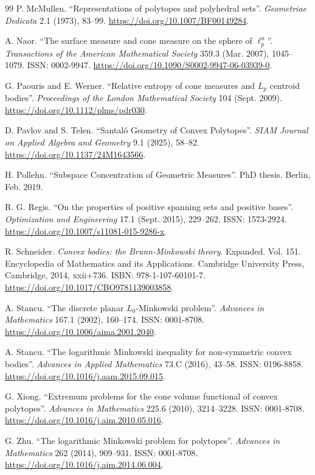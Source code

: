 \documentclass[11pt, a4paper, twoside, reqno]{amsart}
\theoremstyle{definition}
\theoremstyle{remark}
\numberwithin{equation}{section}
\begin{document}
\begin{thebibliography}{99}
P. McMullen. ``Representations of polytopes and polyhedral sets''. \emph{Geometriae Dedicata} 2.1 (1973), 83--99. \url{https://doi.org/10.1007/BF00149284}.

A. Naor. ``The surface measure and cone measure on the sphere of $\ell_p^n$''. \emph{Transactions of the American Mathematical Society} 359.3 (Mar. 2007), 1045--1079. ISSN: 0002-9947. \url{https://doi.org/10.1090/S0002-9947-06-03939-0}.

G. Paouris and E. Werner. ``Relative entropy of cone measures and $L_p$ centroid bodies''. \emph{Proceedings of the London Mathematical Society} 104 (Sept. 2009). \url{https://doi.org/10.1112/plms/pdr030}.

D. Pavlov and S. Telen. ``Santal\'o Geometry of Convex Polytopes''. \emph{SIAM Journal on Applied Algebra and Geometry} 9.1 (2025), 58--82. \url{https://doi.org/10.1137/24M1643566}.

H. Pollehn. ``Subspace Concentration of Geometric Measures''. PhD thesis. Berlin, Feb. 2019.

R. G. Regis. ``On the properties of positive spanning sets and positive bases''. \emph{Optimization and Engineering} 17.1 (Sept. 2015), 229--262. ISSN: 1573-2924. \url{https://doi.org/10.1007/s11081-015-9286-x}.

R. Schneider. \emph{Convex bodies: the Brunn-Minkowski theory}. Expanded. Vol. 151. Encyclopedia of Mathematics and its Applications. Cambridge University Press, Cambridge, 2014, xxii+736. ISBN: 978-1-107-60101-7. \url{https://doi.org/10.1017/CBO9781139003858}.

A. Stancu. ``The discrete planar $L_0$-Minkowski problem''. \emph{Advances in Mathematics} 167.1 (2002), 160--174. ISSN: 0001-8708. \url{https://doi.org/10.1006/aima.2001.2040}.

A. Stancu. ``The logarithmic Minkowski inequality for non-symmetric convex bodies''. \emph{Advances in Applied Mathematics} 73.C (2016), 43--58. ISSN: 0196-8858. \url{https://doi.org/10.1016/j.aam.2015.09.015}.

G. Xiong. ``Extremum problems for the cone volume functional of convex polytopes''. \emph{Advances in Mathematics} 225.6 (2010), 3214--3228. ISSN: 0001-8708. \url{https://doi.org/10.1016/j.aim.2010.05.016}.

G. Zhu. ``The logarithmic Minkowski problem for polytopes''. \emph{Advances in Mathematics} 262 (2014), 909--931. ISSN: 0001-8708. \url{https://doi.org/10.1016/j.aim.2014.06.004}.

\end{thebibliography}

\end{document}
